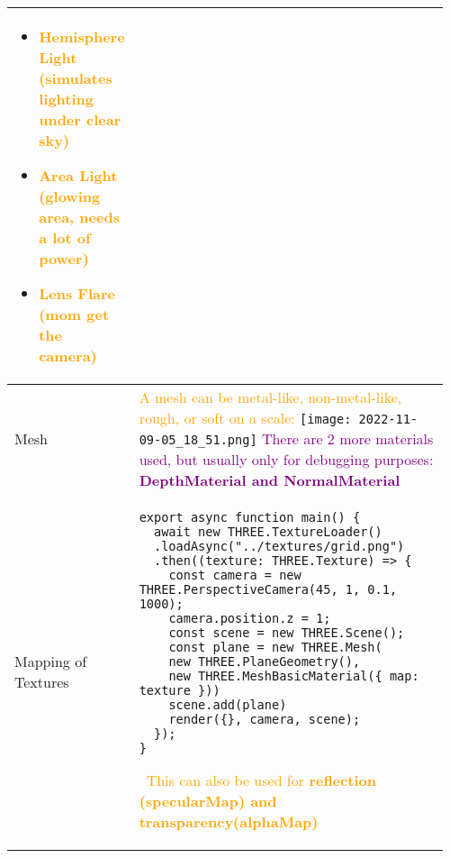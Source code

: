 \documentclass[main.tex,fontsize=8pt,paper=a4,paper=portrait,DIV=calc,]{scrartcl}
\begin{document}
\begin{table}[ht!]
\begin{tabular}{|m{0.2\linewidth}|m{0.755\linewidth}|}
\begin{itemize}
\item \textcolor{orange}{Hemisphere Light (simulates lighting under clear sky)}
\item \textcolor{orange}{Area Light (glowing area, needs a lot of power)}
\item \textcolor{orange}{Lens Flare (mom get the camera)}
\vspace{-3mm}
\end{itemize}\\
\hline
Mesh & 
\textcolor{orange}{A mesh can be metal-like, non-metal-like, rough, or soft on a scale:}\newline
\texttt{[image: 2022-11-09-05\_18\_51.png]}\newline
\textcolor{purple}{There are 2 more materials used, but usually only for debugging purposes:\newline
\textbf{DepthMaterial and NormalMaterial}}\\
\hline
Mapping of Textures & 
\begin{lstlisting}
export async function main() {
  await new THREE.TextureLoader()
  .loadAsync("../textures/grid.png")
  .then((texture: THREE.Texture) => {
    const camera = new THREE.PerspectiveCamera(45, 1, 0.1, 1000);
    camera.position.z = 1;
    const scene = new THREE.Scene();
    const plane = new THREE.Mesh(
    new THREE.PlaneGeometry(),
    new THREE.MeshBasicMaterial({ map: texture }))
    scene.add(plane)
    render({}, camera, scene);
  });
}
\end{lstlisting} 
\, \newline
\textcolor{orange}{This can also be used for \textbf{reflection (specularMap) and transparency(alphaMap)}}\\
\hline
\end{tabular}
\end{table}
\pagebreak
\end{document}

